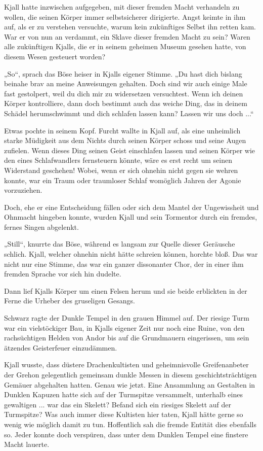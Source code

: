 \documentclass[10pt, a4paper, oneside]{book}
\begin{document}
Kjall hatte inzwischen aufgegeben, mit dieser fremden Macht verhandeln zu wollen, die seinen Körper immer selbstsicherer dirigierte. Angst keimte in ihm auf, als er zu verstehen versuchte, warum kein zukünftiges Selbst ihn retten kam. War er von nun an verdammt, ein Sklave dieser fremden Macht zu sein? Waren alle zukünftigen Kjalls, die er in seinem geheimen Museum gesehen hatte, von diesem Wesen gesteuert worden?

„So“, sprach das Böse heiser in Kjalls eigener Stimme. „Du hast dich bislang beinahe brav an meine Anweisungen gehalten. Doch sind wir auch einige Male fast gestolpert, weil du dich mir zu widersetzen versuchtest. Wenn ich deinen Körper kontrolliere, dann doch bestimmt auch das weiche Ding, das in deinem Schädel herumschwimmt und dich schlafen lassen kann? Lassen wir uns doch ...“

Etwas pochte in seinem Kopf. Furcht wallte in Kjall auf, als eine unheimlich starke Müdigkeit aus dem Nichts durch seinen Körper schoss und seine Augen zufielen. Wenn dieses Ding seinen Geist einschlafen lassen und seinen Körper wie den eines Schlafwandlers fernsteuern könnte, wäre es erst recht um seinen Widerstand geschehen! Wobei, wenn er sich ohnehin nicht gegen sie wehren konnte, war ein Traum oder traumloser Schlaf womöglich Jahren der Agonie vorzuziehen.

Doch, ehe er eine Entscheidung fällen oder sich dem Mantel der Ungewissheit und Ohnmacht hingeben konnte, wurden Kjall und sein Tormentor durch ein fremdes, fernes Singen abgelenkt.

„Still“, knurrte das Böse, während es langsam zur Quelle dieser Geräusche schlich. Kjall, welcher ohnehin nicht hätte schreien können, horchte bloß. Das war nicht nur eine Stimme, das war ein ganzer dissonanter Chor, der in einer ihm fremden Sprache vor sich hin dudelte.

Dann lief Kjalls Körper um einen Felsen herum und sie beide erblickten in der Ferne die Urheber des gruseligen Gesangs.

Schwarz ragte der Dunkle Tempel in den grauen Himmel auf. Der riesige Turm war ein vielstöckiger Bau, in Kjalls eigener Zeit nur noch eine Ruine, von den rachsüchtigen Helden von Andor bis auf die Grundmauern eingerissen, um sein ätzendes Geisterfeuer einzudämmen.

Kjall wusste, dass düstere Drachenkultisten und geheimnisvolle Greifenanbeter der Grehon gelegentlich gemeinsam dunkle Messen in diesem geschichtsträchtigen Gemäuer abgehalten hatten. Genau wie jetzt. Eine Ansammlung an Gestalten in Dunklen Kapuzen hatte sich auf der Turmspitze versammelt, unterhalb eines gewaltigen ... war das ein Skelett? Befand sich ein riesiges Skelett auf der Turmspitze? Was auch immer diese Kultisten hier taten, Kjall hätte gerne so wenig wie möglich damit zu tun. Hoffentlich sah die fremde Entität dies ebenfalls so. Jeder konnte doch verspüren, dass unter dem Dunklen Tempel eine finstere Macht lauerte.
\end{document}
